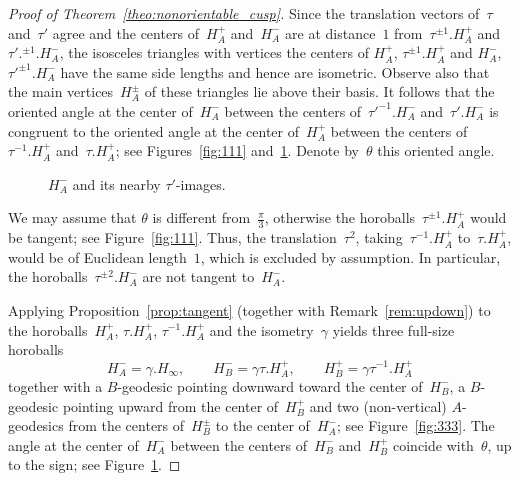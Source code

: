 \documentclass[11pt,reqno]{amsart}
\theoremstyle{definition}
\numberwithin{equation}{section}
\numberwithin{equation}{section}
\begin{document}
\begin{proof}[Proof of Theorem~\ref{theo:nonorientable_cusp}]
Since the translation vectors of~$\tau$ and~$\tau'$ agree and the centers of~$H_A^+$ and~$H_A^-$ are at distance~$1$ from~$\tau^{\pm 1}.H_A^+$ and~$\tau'.^{\pm 1}.H_A^-$, the isosceles triangles with vertices the centers of $H_A^+$, $\tau^{\pm 1}.H_A^+$ and $H_A^-$, $\tau'^{\pm 1}.H_A^-$ have the same side lengths and hence are isometric.
Observe also that the main vertices~$H_A^{\pm}$ of these triangles lie above their basis.
It follows that the oriented angle at the center of~$H_A^-$ between the centers of~$\tau'^{-1}.H_A^-$ and~$\tau'.H_A^-$ is congruent to the oriented angle at the center of~$H_A^+$ between the centers of~$\tau^{-1}.H_A^+$ and~$\tau.H_A^+$; see Figures~\ref{fig:111} and~\ref{fig:222}.
Denote by~$\theta$ this oriented angle.




\medskip


\begin{figure}[htbp!]
\centering
\vspace*{1.3cm}
\hspace*{-0.5cm}
\def\svgwidth{0.4\textheight}

\vspace*{0.3cm}
\caption{$H_A^-$ and its nearby $\tau'$-images.} \label{fig:222}
\end{figure}


We may assume that $\theta$ is different from~$\frac{\pi}{3}$, otherwise the horoballs~$\tau^{\pm 1}.H_A^+$ would be tangent; see Figure~\ref{fig:111}.
Thus, the translation~$\tau^2$, taking~$\tau^{-1}.H_A^+$ to~$\tau.H_A^+$, would be of Euclidean length~$1$, which is excluded by assumption.
In particular, the horoballs~$\tau^{\pm 2}.H_A^-$ are not tangent to~$H_A^-$.

\medskip


Applying Proposition~\ref{prop:tangent} (together with Remark~\ref{rem:updown}) to the horoballs~$H_A^+$, $\tau.H_A^+$, $\tau^{-1}.H_A^+$ and the isometry~$\gamma$ yields three full-size horoballs 
\[
H_A^-=\gamma.H_\infty, \qquad H_B^-=\gamma \tau.H_A^+, \qquad H_B^+= \gamma \tau^{-1}.H_A^+
\] 
together with a $B$-geodesic pointing downward toward the center of~$H_B^-$, a $B$-geodesic pointing upward from the center of~$H_B^+$ and two (non-vertical) $A$-geodesics from the centers of~$H_B^{\pm }$ to the center of~$H_A^-$; see Figure~\ref{fig:333}.
The angle at the center of~$H_A^-$ between the centers of~$H_B^-$ and~$H_B^+$ coincide with~$\theta$, up to the sign; see Figure~\ref{fig:222}.




\end{proof}
\end{document}
